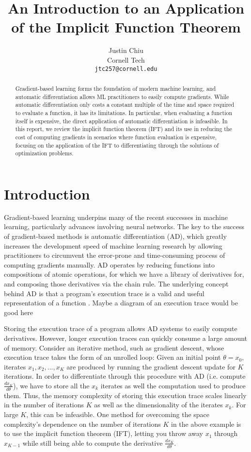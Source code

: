 \documentclass[11pt]{article}
\title{An Introduction to an Application of the Implicit Function Theorem}
\author{Justin Chiu \\
  Cornell Tech \\
  \texttt{jtc257@cornell.edu}}
\begin{document}
\maketitle
\begin{abstract}
Gradient-based learning forms the foundation of modern machine learning,
and automatic differentiation allows ML practitioners to easily compute gradients.
While automatic differentiation only costs a constant multiple of the time and space
required to evaluate a function, it has its limitations.
In particular, when evaluating a function itself is expensive,
the direct application of automatic differentiation is infeasible.
In this report, we review the implicit function theorem (IFT)
and its use in reducing the cost of computing gradients in scenarios where
function evaluation is expensive,
focusing on the application of the IFT to differentiating
through the solutions of optimization problems.
\end{abstract}

\section{Introduction}
\label{sec:intro}
Gradient-based learning underpins many of the recent successes in machine learning,
particularly advances involving neural networks.
The key to the success of gradient-based methods is automatic differentiation (AD),
which greatly increases the development speed of machine learning research by
allowing practitioners to circumvent the error-prone and time-consuming process
of computing gradients manually.
AD operates by reducing functions into compositions of atomic operations,
for which we have a library of derivatives for,
and composing those derivatives via the chain rule.
The underlying concept behind AD is that a program's execution trace is a valid
and useful representation of a function \citep{griewank2008autodiff}.
{\color{red}Maybe a diagram of an execution trace would be good here}

Storing the execution trace of a program allows AD systems to easily compute derivatives.
However, longer execution traces can quickly consume a large amount of memory.
Consider an iterative method, such as gradient descent,
whose execution trace takes the form of an unrolled loop:
Given an initial point $\theta = x_0$,
iterates $x_1, x_2, ..., x_{K}$ are produced by running the gradient descent
update for $K$ iterations.
In order to differentiate through this procedure with AD
(i.e. compute $\frac{dx_K}{d\theta}$),
we have to store all the $x_k$ iterates
as well the computation used to produce them.
Thus, the memory complexity of storing this execution trace scales linearly in the
number of iterations $K$ as well as the dimensionality of the iterates $x_k$.
For large $K$, this can be infeasible.
One method for overcoming the space complexity's dependence on the number of iterations $K$ in
the above example is to use the implicit function theorem (IFT),
letting you throw away $x_1$ through $x_{K-1}$
while still being able to compute the derivative $\frac{dx_{K}}{d\theta}$.
\end{document}
